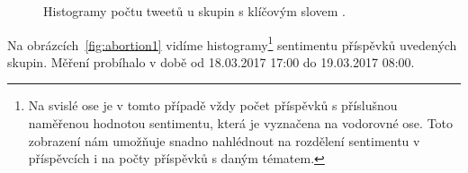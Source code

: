 \documentclass[12pt, a4paper]{article}
\numberwithin{equation}{section} 	%
\begin{document}
\begin{figure}[!h]
\centering
{}
\caption[]{Histogramy počtu tweetů u skupin s klíčovým slovem \textit{}.}
\label{fig:abortion1}
\end{figure}

Na obrázcích~\autoref{fig:abortion1} vidíme histogramy\footnote{Na svislé ose je v tomto případě vždy počet příspěvků s příslušnou naměřenou hodnotou sentimentu, která je vyznačena na vodorovné ose. Toto zobrazení nám umožňuje snadno nahlédnout na rozdělení sentimentu v příspěvcích i na počty příspěvků s daným tématem.} sentimentu příspěvků uvedených skupin. Měření probíhalo v době od 18.03.2017 17:00 do 19.03.2017 08:00.
\end{document}
